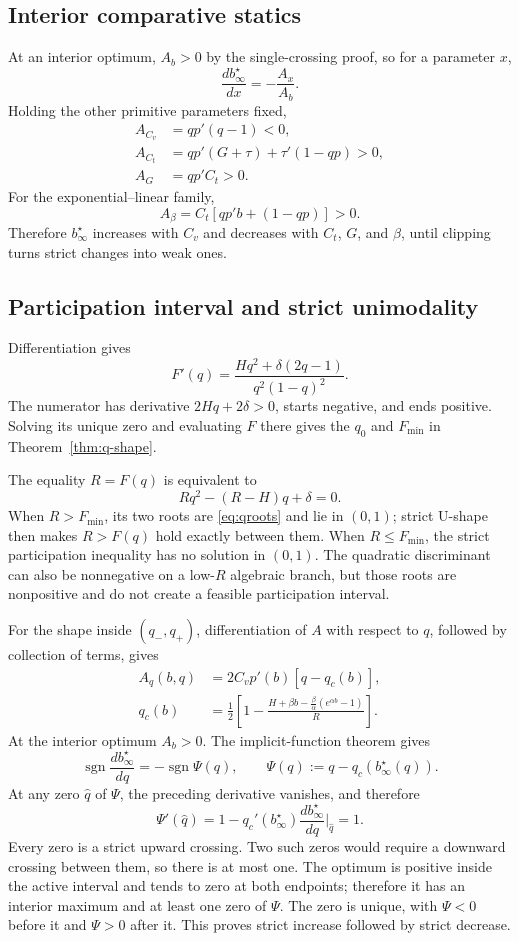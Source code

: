 \subsection{Interior comparative statics}

At an interior optimum, \(A_b>0\) by the single-crossing proof, so for a
parameter \(x\),
\[
 \frac{d b_\infty^\star}{dx}=-\frac{A_x}{A_b}.
\]
Holding the other primitive parameters fixed,
\begin{align*}
 A_{C_v}&=q p'(q-1)<0,\\
 A_{C_t}&=q p'(G+\tau)+\tau'(1-qp)>0,\\
 A_G&=q p'C_t>0.
\end{align*}
For the exponential--linear family,
\[
 A_\beta=C_t[q p'b+(1-qp)]>0.
\]
Therefore \(b_\infty^\star\) increases with \(C_v\) and decreases with
\(C_t\), \(G\), and \(\beta\), until clipping turns strict changes into weak
ones.

\subsection{Participation interval and strict unimodality}

Differentiation gives
\[
 F'(q)=
 \frac{Hq^2+\delta(2q-1)}{q^2(1-q)^2}.
\]
The numerator has derivative \(2Hq+2\delta>0\), starts negative, and ends
positive.  Solving its unique zero and evaluating \(F\) there gives the
\(q_0\) and \(F_{\min}\) in Theorem~\ref{thm:q-shape}.

The equality \(R=F(q)\) is equivalent to
\[
 Rq^2-(R-H)q+\delta=0.
\]
When \(R>F_{\min}\), its two roots are \eqref{eq:qroots} and lie in
\((0,1)\); strict U-shape then makes \(R>F(q)\) hold exactly between them.
When \(R\leq F_{\min}\), the strict participation inequality has no solution
in \((0,1)\).  The quadratic discriminant can also be nonnegative on a
low-\(R\) algebraic branch, but those roots are nonpositive and do not create
a feasible participation interval.

For the shape inside \((q_-,q_+)\), differentiation of \(A\) with respect to
\(q\), followed by collection of terms, gives
\begin{align}
 A_q(b,q)&=2C_v p'(b)[q-q_c(b)],\\
 q_c(b)&=\frac12\left[
 1-\frac{H+\beta b-\frac{\beta}{\alpha}(e^{\alpha b}-1)}{R}
 \right].
\end{align}
At the interior optimum \(A_b>0\).  The implicit-function theorem gives
\[
 \operatorname{sgn}\frac{d b_\infty^\star}{dq}
 =-\operatorname{sgn}\Psi(q),\qquad
 \Psi(q):=q-q_c(b_\infty^\star(q)).
\]
At any zero \(\widehat q\) of \(\Psi\), the preceding derivative vanishes,
and therefore
\[
 \Psi'(\widehat q)
 =1-q_c'(b_\infty^\star)
 \frac{db_\infty^\star}{dq}\bigg|_{\widehat q}=1.
\]
Every zero is a strict upward crossing.  Two such zeros would require a
downward crossing between them, so there is at most one.  The optimum is
positive inside the active interval and tends to zero at both endpoints;
therefore it has an interior maximum and at least one zero of \(\Psi\).
The zero is unique, with \(\Psi<0\) before it and \(\Psi>0\) after it.  This
proves strict increase followed by strict decrease.

